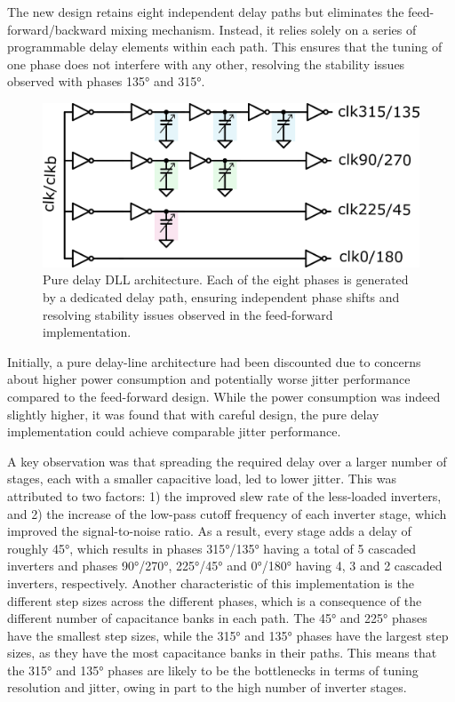 The new design retains eight independent delay paths but eliminates the feed-forward/backward mixing mechanism. Instead, it relies solely on a series of programmable delay elements within each path. This ensures that the tuning of one phase does not interfere with any other, resolving the stability issues observed with phases \ang{135} and \ang{315}.

\begin{figure}[H]
  \centering
  \includegraphics[width=0.8\linewidth]{figures/Schematics/pure_delay.png}
  \caption{Pure delay DLL architecture. Each of the eight phases is generated by a dedicated delay path, ensuring independent phase shifts and resolving stability issues observed in the feed-forward implementation.}
  \label{fig:pure_delay}
\end{figure}


Initially, a pure delay-line architecture had been discounted due to concerns about higher power consumption and potentially worse jitter performance compared to the feed-forward design. While the power consumption was indeed slightly higher, it was found that with careful design, the pure delay implementation could achieve comparable jitter performance.

A key observation was that spreading the required delay over a larger number of stages, each with a smaller capacitive load, led to lower jitter. This was attributed to two factors: 1) the improved slew rate of the less-loaded inverters, and 2) the increase of the low-pass cutoff frequency of each inverter stage, which improved the signal-to-noise ratio. As a result, every stage adds a delay of roughly \ang{45}, which results in phases \ang{315}/\ang{135} having a total of 5 cascaded inverters and phases \ang{90}/\ang{270}, \ang{225}/\ang{45} and \ang{0}/\ang{180} having 4, 3 and 2 cascaded inverters, respectively.
Another characteristic of this implementation is the different step sizes across the different phases, which is a consequence of the different number of capacitance banks in each path. The \ang{45} and \ang{225} phases have the smallest step sizes, while the \ang{315} and \ang{135} phases have the largest step sizes, as they have the most capacitance banks in their paths. This means that the \ang{315} and \ang{135} phases are likely to be the bottlenecks in terms of tuning resolution and jitter, owing in part to the high number of inverter stages.

